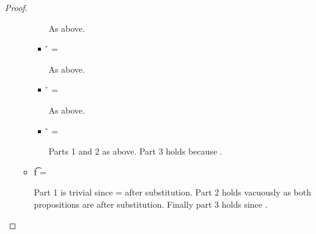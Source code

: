 \begin{lemma}
\begin{proof}
\begin{case}[T-App]
\begin{itemize}
\begin{subcase}[B-Delta]
\begin{itemize}
\begin{subcase}[\const{} = \classconst]
\begin{itemize}
\begin{subcase}[\v{2} = {\closure {\openv{}} {\abs {\x{}} {\t{}} {\e{}}}}]
              As above.
                  \end{subcase}
          \item[] \begin{subcase}[\v{2} = {\multi {\v{d}} {\disptable{}}}] \v{} = \HMapInstance{}


              As above.
                  \end{subcase}
          \item[] \begin{subcase}[\v{2} = {\curlymapvaloverright{\v{1}}{\v{2}}}] \v{} = \Keyword{}


              As above.
                  \end{subcase}
          \item[] \begin{subcase}[\v{2} = {\nil{}}] \v{} = \nil{}

             Parts 1 and 2 as above.
                    Part 3 holds because {}.
                  \end{subcase}
        \end{itemize}
      \end{subcase}
    \item[]
      \begin{subcase}[\const{} = \throwconst]
        {\ArrowOne {\x{}} {\s{}}
                                                       {\t{f}}
                                                       {
                                                                   {}}
                                                       {}}
                                                       =
        {\ArrowOne {\x{}} {\Top{}}
                                      {\Bot{}}
                                      {\filterset {\botprop{}}
                                                  {\botprop{}}}
                                      {\emptyobject{}}}

                                      Part 1 is trivial since \object{} = \emptyobject{} after substitution.
                                      Part 2 holds vacuously as both propositions are \botprop{} after substitution.
                                      Finally part 3 holds since {}.

      \end{subcase}
  \end{itemize}


\end{subcase}
\end{itemize}
\end{case}
\end{proof}
\end{lemma}
